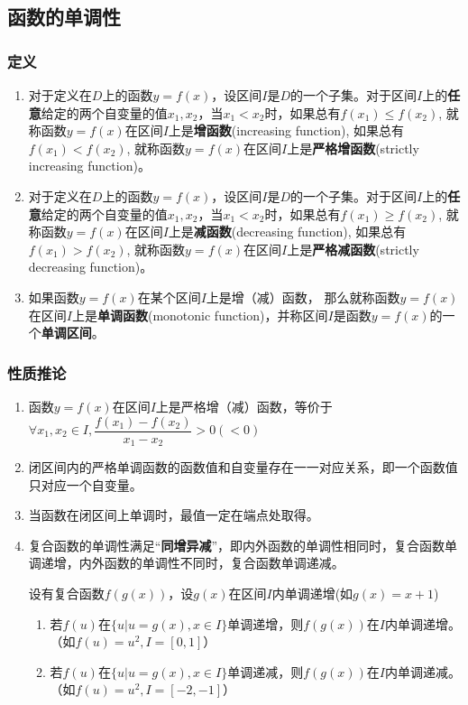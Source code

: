 \subsection*{函数的单调性}
\subsubsection*{定义}
\begin{enumerate}
    \item 对于定义在$D$上的函数$y=f(x)$，设区间$I$是$D$的一个子集。对于区间$I$上的\textbf{任意}给定的两个自变量的值$x_1, x_2$，当$x_1 < x_2$时，如果总有$f(x_1) \leq f(x_2)$, 就称函数$y=f(x)$在区间$I$上是\textbf{增函数}(increasing function), 如果总有$f(x_1) < f(x_2)$, 就称函数$y=f(x)$在区间$I$上是\textbf{严格增函数}(strictly increasing function)。
    \item 对于定义在$D$上的函数$y=f(x)$，设区间$I$是$D$的一个子集。对于区间$I$上的\textbf{任意}给定的两个自变量的值$x_1, x_2$，当$x_1 < x_2$时，如果总有$f(x_1) \geq f(x_2)$, 就称函数$y=f(x)$在区间$I$上是\textbf{减函数}(decreasing function), 如果总有$f(x_1) > f(x_2)$, 就称函数$y=f(x)$在区间$I$上是\textbf{严格减函数}(strictly decreasing function)。
    \item 如果函数$y = f(x)$在某个区间$I$上是增（减）函数， 那么就称函数$y = f(x)$在区间$I$上是\textbf{单调函数}(monotonic function)，并称区间$I$是函数$y = f(x)$的一个\textbf{单调区间}。
\end{enumerate}
\subsubsection*{性质推论}
\begin{enumerate}
    \item 函数$y=f(x)$在区间$I$上是严格增（减）函数，等价于$\forall x_1, x_2 \in I, \dfrac{f(x_1) - f(x_2)}{x_1 - x_2} > 0 (< 0)$
    \item 闭区间内的严格单调函数的函数值和自变量存在一一对应关系，即一个函数值只对应一个自变量。
    \item 当函数在闭区间上单调时，最值一定在端点处取得。
    \item 复合函数的单调性满足“\textbf{同增异减}”，即内外函数的单调性相同时，复合函数单调递增，内外函数的单调性不同时，复合函数单调递减。\\
    \begin{example}
        设有复合函数$f(g(x))$，设$g(x)$在区间$I$内单调递增(如$g(x) = x+1$)
        \begin{enumerate}
            \item 若$f(u)$在$\{u | u = g(x), x \in I\}$单调递增，则$f(g(x))$在$I$内单调递增。（如$f(u) = u^2, I = [0, 1]$）
            \item 若$f(u)$在$\{u | u = g(x), x \in I\}$单调递减，则$f(g(x))$在$I$内单调递减。（如$f(u) = u^2, I = [-2, -1]$）
        \end{enumerate}
    \end{example}
\end{enumerate}
